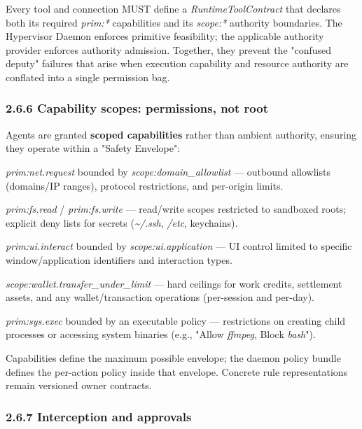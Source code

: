 \documentclass[
  11pt,
]{article}
\begin{document}
Every tool and connection MUST define a \emph{RuntimeToolContract} that
declares both its required \emph{prim:*} capabilities and its
\emph{scope:*} authority boundaries. The Hypervisor Daemon enforces
primitive feasibility; the applicable authority provider enforces authority
admission. Together, they prevent the "confused deputy" failures that
arise when execution capability and resource authority are conflated
into a single permission bag.

\hypertarget{capability-scopes-permissions-not-root}{%
\subsubsection{2.6.6 Capability scopes: permissions, not
root}\label{capability-scopes-permissions-not-root}}

Agents are granted \textbf{scoped capabilities} rather than ambient
authority, ensuring they operate within a "Safety Envelope":

\emph{prim:net.request} bounded by \emph{scope:domain\_allowlist} ---
outbound allowlists (domains/IP ranges), protocol restrictions, and
per-origin limits.

\emph{prim:fs.read} / \emph{prim:fs.write} --- read/write scopes
restricted to sandboxed roots; explicit deny lists for secrets
(\emph{\textasciitilde/.ssh}, \emph{/etc}, keychains).

\emph{prim:ui.interact} bounded by \emph{scope:ui.application} --- UI
control limited to specific window/application identifiers and interaction
types.

\emph{scope:wallet.transfer\_under\_limit} --- hard ceilings for work
credits, settlement assets, and any wallet/transaction operations
(per-session and per-day).

\emph{prim:sys.exec} bounded by an executable policy --- restrictions on
creating child processes or accessing system binaries (e.g., "Allow
\emph{ffmpeg}, Block \emph{bash}").

Capabilities define the maximum possible envelope; the daemon policy
bundle defines the per-action policy inside that envelope. Concrete rule
representations remain versioned owner contracts.

\hypertarget{interception-and-approvals}{%
\subsubsection{2.6.7 Interception and
approvals}\label{interception-and-approvals}}
\end{document}
